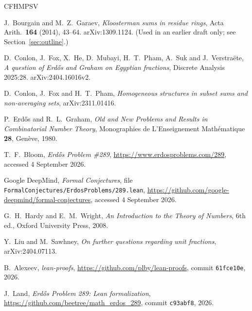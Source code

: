 \documentclass[11pt,letterpaper]{article}
\numberwithin{equation}{section}
\theoremstyle{plain}
\theoremstyle{remark}
\begin{document}
\begin{thebibliography}{CFHMPSV}

 J.~Bourgain and M.~Z.~Garaev, \emph{Kloosterman sums in residue rings}, Acta Arith.\ \textbf{164} (2014), 43--64. arXiv:1309.1124. (Used in an earlier draft only; see Section~\ref{sec:outline}.)

 D.~Conlon, J.~Fox, X.~He, D.~Mubayi, H.~T.~Pham, A.~Suk and J.~Verstra\"ete, \emph{A question of Erd\H{o}s and Graham on Egyptian fractions}, Discrete Analysis 2025:28. arXiv:2404.16016v2.

 D.~Conlon, J.~Fox and H.~T.~Pham, \emph{Homogeneous structures in subset sums and non-averaging sets}, arXiv:2311.01416.

 P.~Erd\H{o}s and R.~L.~Graham, \emph{Old and New Problems and Results in Combinatorial Number Theory}, Monographies de L'Enseignement Math\'ematique \textbf{28}, Gen\`eve, 1980.

 T.~F.~Bloom, \emph{Erd\H{o}s Problem \#289}, \url{https://www.erdosproblems.com/289}, accessed 4 September 2026.

 Google DeepMind, \emph{Formal Conjectures}, file \texttt{FormalConjectures/\allowbreak ErdosProblems/\allowbreak 289.lean}, \url{https://github.com/google-deepmind/formal-conjectures}, accessed 4 September 2026.

 G.~H.~Hardy and E.~M.~Wright, \emph{An Introduction to the Theory of Numbers}, 6th ed., Oxford University Press, 2008.

 Y.~Liu and M.~Sawhney, \emph{On further questions regarding unit fractions}, arXiv:2404.07113.

 B.~Alexeev, \emph{lean-proofs}, \url{https://github.com/plby/lean-proofs}, commit \texttt{61fce10e}, 2026.

 J.~Land, \emph{Erd\H{o}s Problem 289: Lean formalization}, \url{https://github.com/beetree/math_erdos_289}, commit \texttt{c93abf8}, 2026.

\end{thebibliography}
\end{document}
